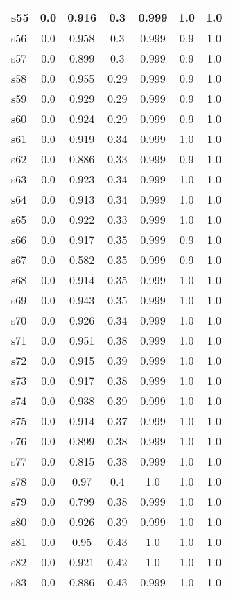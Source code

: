\documentclass{article}
\begin{document}
\begin{tabular}{|l|c|c|c|c|c|c|}
s55 &0.0 & 0.916 & 0.3 & 0.999 & 1.0 & 1.0\\
\hline
s56 &0.0 & 0.958 & 0.3 & 0.999 & 0.9 & 1.0\\
\hline
s57 &0.0 & 0.899 & 0.3 & 0.999 & 0.9 & 1.0\\
\hline
s58 &0.0 & 0.955 & 0.29 & 0.999 & 0.9 & 1.0\\
\hline
s59 &0.0 & 0.929 & 0.29 & 0.999 & 0.9 & 1.0\\
\hline
s60 &0.0 & 0.924 & 0.29 & 0.999 & 0.9 & 1.0\\
\hline
s61 &0.0 & 0.919 & 0.34 & 0.999 & 1.0 & 1.0\\
\hline
s62 &0.0 & 0.886 & 0.33 & 0.999 & 0.9 & 1.0\\
\hline
s63 &0.0 & 0.923 & 0.34 & 0.999 & 1.0 & 1.0\\
\hline
s64 &0.0 & 0.913 & 0.34 & 0.999 & 1.0 & 1.0\\
\hline
s65 &0.0 & 0.922 & 0.33 & 0.999 & 1.0 & 1.0\\
\hline
s66 &0.0 & 0.917 & 0.35 & 0.999 & 0.9 & 1.0\\
\hline
s67 &0.0 & 0.582 & 0.35 & 0.999 & 0.9 & 1.0\\
\hline
s68 &0.0 & 0.914 & 0.35 & 0.999 & 1.0 & 1.0\\
\hline
s69 &0.0 & 0.943 & 0.35 & 0.999 & 1.0 & 1.0\\
\hline
s70 &0.0 & 0.926 & 0.34 & 0.999 & 1.0 & 1.0\\
\hline
s71 &0.0 & 0.951 & 0.38 & 0.999 & 1.0 & 1.0\\
\hline
s72 &0.0 & 0.915 & 0.39 & 0.999 & 1.0 & 1.0\\
\hline
s73 &0.0 & 0.917 & 0.38 & 0.999 & 1.0 & 1.0\\
\hline
s74 &0.0 & 0.938 & 0.39 & 0.999 & 1.0 & 1.0\\
\hline
s75 &0.0 & 0.914 & 0.37 & 0.999 & 1.0 & 1.0\\
\hline
s76 &0.0 & 0.899 & 0.38 & 0.999 & 1.0 & 1.0\\
\hline
s77 &0.0 & 0.815 & 0.38 & 0.999 & 1.0 & 1.0\\
\hline
s78 &0.0 & 0.97 & 0.4 & 1.0 & 1.0 & 1.0\\
\hline
s79 &0.0 & 0.799 & 0.38 & 0.999 & 1.0 & 1.0\\
\hline
s80 &0.0 & 0.926 & 0.39 & 0.999 & 1.0 & 1.0\\
\hline
s81 &0.0 & 0.95 & 0.43 & 1.0 & 1.0 & 1.0\\
\hline
s82 &0.0 & 0.921 & 0.42 & 1.0 & 1.0 & 1.0\\
\hline
s83 &0.0 & 0.886 & 0.43 & 0.999 & 1.0 & 1.0\\

\end{tabular}
\end{document}

